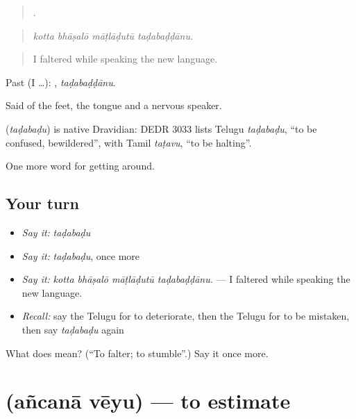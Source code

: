 \begin{quote}
   .
\end{quote}

\begin{quote}
\emph{kotta bhāṣalō māṭlāḍutū taḍabaḍḍānu.}
\end{quote}

\begin{quote}
I faltered while speaking the new language.
\end{quote}

Past (I …): , \emph{taḍabaḍḍānu}.

Said of the feet, the tongue and a nervous speaker.

\begin{cousinweb}
\textbf{} (\emph{taḍabaḍu}) is native Dravidian: DEDR 3033 lists Telugu \emph{taḍabaḍu}, \textquotedblleft{}to be confused, bewildered\textquotedblright{}, with Tamil \emph{taṭavu}, \textquotedblleft{}to be halting\textquotedblright{}.
\end{cousinweb}

\begin{grammarlens}[title={What you've built}]
One more word for getting around.
\end{grammarlens}

\subsection*{Your turn}
\begin{itemize}
\raggedright
  \item \emph{Say it:} \emph{taḍabaḍu}
  \item \emph{Say it:} \emph{taḍabaḍu}, once more
  \item \emph{Say it:} \emph{kotta bhāṣalō māṭlāḍutū taḍabaḍḍānu.} — I faltered while speaking the new language.
  \item \emph{Recall:} say the Telugu for to deteriorate, then the Telugu for to be mistaken, then say \emph{taḍabaḍu} again
\end{itemize}

\begin{tcolorbox}[breakable,colback=teal!4,colframe=teal!35!black,title={Before you move on}]
What does  mean? (\textquotedblleft{}To falter; to stumble\textquotedblright{}.) Say it once more.
\end{tcolorbox}
\section[\texorpdfstring{\te{అంచనా} \te{వేయు} (añcanā vēyu)}{అంచనా వేయు (añcanā vēyu)}]{  (añcanā vēyu) — to estimate}

